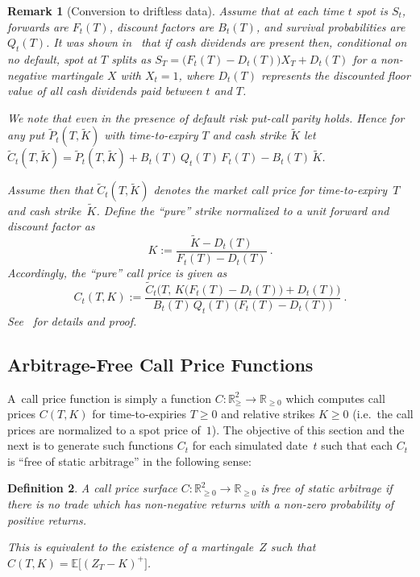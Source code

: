 \documentclass[11pt,a4paper]{article}
\newtheorem{definition}{Definition}[section]
\newtheorem{remark}[definition]{Remark}
\newcommand{\R}{\mathbb{R}}
\newcommand{\E}{\mathbb{E}}
\begin{document}
\begin{remark}[Conversion to driftless data]\label{rem:driftless}
  Assume that at each time $t$ spot is $S_t$, forwards are $F_t(T)$, discount factors are $B_t(T)$,
  and survival probabilities are $Q_t(T)$. It was shown in~\cite{BuehlerVolAndDivs} that if cash dividends 
  are present then, conditional on no default, spot at $T$ splits as $S_T = \big(F_t(T)-D_t(T)\big) X_T + D_t(T)$
  for a non-negative martingale $X$ with $X_t=1$, where $D_t(T)$ represents the discounted floor value of all
  cash dividends paid between $t$ and $T$.

  We note that even in the presence of default risk put-call parity holds. Hence for any put $\tilde P_t(T,\tilde K)$ with time-to-expiry $T$ and cash strike $\tilde{K}$ 
  let $\tilde C_t(T,\tilde{K}) = \tilde P_t(T,\tilde{K}) + B_t(T)\, Q_t(T)\, F_t(T) - B_t(T)\, \tilde{K}$.

  Assume then that $\tilde C_t(T,\tilde{K})$ denotes the market call price for time-to-expiry~$T$ and cash strike~$\tilde K$. 
  Define the ``pure'' strike normalized to a unit forward and discount factor as
  $$
  K := \frac{ \tilde K - D_t(T) }{ F_t(T) - D_t(T) }  \ .
  $$
  Accordingly, the ``pure'' call price is given as
  $$
    C_t(T,K) := \frac{\tilde{C}_t\Big(T,\, K\big(F_t(T)-D_t(T)\big) + D_t(T)\Big)}{B_t(T) \, Q_t(T)\,\big(F_t(T)-D_t(T)\big)} \ .
  $$
 See~\cite{BuehlerVolAndDivs} for details and proof.
\end{remark}

\subsection{Arbitrage-Free Call Price Functions}

A~call price function is simply a function $C:\R^2_{\geq} \longrightarrow  \R_{\geq 0}$
which computes call prices $C(T,K)$ for time-to-expiries $T\geq 0$ and relative
strikes $K\geq 0$ (i.e.~the call prices are normalized to a spot price of~$1$). 
The objective of this section and the next is to generate such functions $C_t$ for each
simulated date~$t$ such that each $C_t$ is ``free of static arbitrage'' in the following sense:

\begin{definition}
A call price surface $C: \R^2_{\geq 0}\to \R_{\geq 0}$ is \emph{free of static arbitrage} if there is no trade
which has non-negative returns with a non-zero probability of
positive returns.    

This is equivalent to the existence of a
martingale~$Z$ such that $C(T,K)= \E\big[(Z_{T}-K)^+\big]$.
\end{definition}
\end{document}
